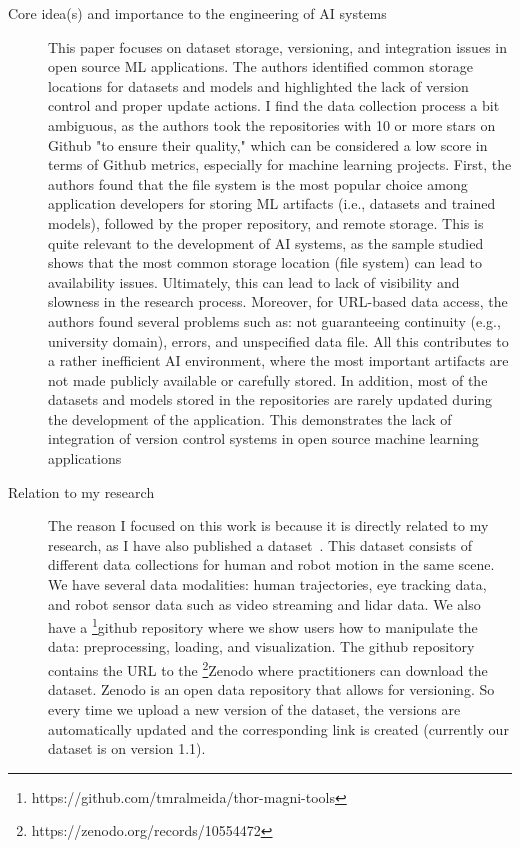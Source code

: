 \documentclass{article}
\begin{document}
\begin{description}
    \item[Core idea(s) and importance to the engineering of AI systems] This paper focuses on dataset storage, versioning, and integration issues in open source ML applications. The authors identified common storage locations for datasets and models and highlighted the lack of version control and proper update actions. I find the data collection process a bit ambiguous, as the authors took the repositories with 10 or more stars on Github "to ensure their quality," which can be considered a low score in terms of Github metrics, especially for machine learning projects. First, the authors found that the file system is the most popular choice among application developers for storing ML artifacts (i.e., datasets and trained models), followed by the proper repository, and remote storage. This is quite relevant to the development of AI systems, as the sample studied shows that the most common storage location (file system) can lead to availability issues. Ultimately, this can lead to lack of visibility and slowness in the research process. Moreover, for URL-based data access, the authors found several problems such as: not guaranteeing continuity (e.g., university domain), errors, and unspecified data file. All this contributes to a rather inefficient AI environment, where the most important artifacts are not made publicly available or carefully stored. 
    In addition, most of the datasets and models stored in the repositories are rarely updated during the development of the application. This demonstrates the lack of integration of version control systems in open source machine learning applications

    \item[Relation to my research] The reason I focused on this work is because it is directly related to my research, as I have also published a dataset~\cite{magni24}. This dataset consists of different data collections for human and robot motion in the same scene. We have several data modalities: human trajectories, eye tracking data, and robot sensor data such as video streaming and lidar data. We also have a \footnote{https://github.com/tmralmeida/thor-magni-tools}{github repository} where we show users how to manipulate the data: preprocessing, loading, and visualization. The github repository contains the URL to the \footnote{https://zenodo.org/records/10554472}{Zenodo} where practitioners can download the dataset. Zenodo is an open data repository that allows for versioning. So every time we upload a new version of the dataset, the versions are automatically updated and the corresponding link is created (currently our dataset is on version 1.1). 


\end{description}
\end{document}
